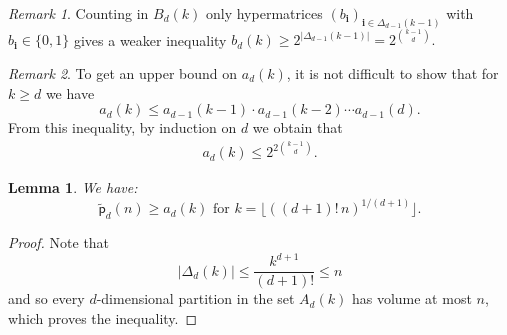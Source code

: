 \documentclass[12pt]{amsart}
\newtheorem{lemma}[theorem]{Lemma}
\theoremstyle{definition}
\theoremstyle{remark}
\newtheorem{remark}{Remark}
\begin{document}
\begin{remark}
Counting in $B_d(k)$ only 
hypermatrices $(b_{\mathbf{i}})_{\mathbf{i} \in \Delta_{d-1}(k-1)}$ with $b_{\mathbf{i}} \in \{0,1\}$ gives a weaker inequality $b_d(k) \ge 2^{|\Delta_{d - 1}(k - 1)|} = 2^{\binom{k - 1}{d}}.$
\end{remark}


\begin{remark}\label{aup}
To get an upper bound on $a_d(k)$, it is not difficult to show that for $k \ge d$ we have
$$
a_{d}(k) \le a_{d-1}(k-1) \cdot a_{d-1}(k-2) \cdots a_{d-1}(d).
$$
From this inequality, by induction on $d$ we obtain that 
\begin{align*}%
a_d(k) \le 2^{2 \binom{k-1}{d}}. %
\end{align*}
\end{remark}


\begin{lemma}\label{lempa}
We have: 
$$\widetilde{\mathsf{p}}_{d}(n) \ge a_{d}(k) \text{ for } k  = \lfloor ((d+1)!\, n)^{1/(d+1)} \rfloor.$$ 
\end{lemma}
\begin{proof}
Note that 
$$|\Delta_{d}(k)| \le \frac{k^{d+1}}{(d+1)!} \le n$$
and so every $d$-dimensional partition in the set $A_{d}(k)$ has volume at most $n$, which proves the inequality.
\end{proof}

\end{document}
